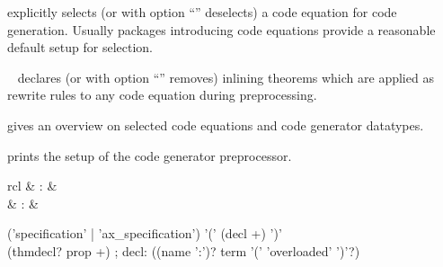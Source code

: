 \begin{isabellebody}
\begin{isamarkuptext}
\begin{description}
  \item \hyperlink{attribute.HOL.code}{\mbox{}} explicitly selects (or with option
  ``'' deselects) a code equation for code
  generation.  Usually packages introducing code equations provide
  a reasonable default setup for selection.

  \item \hyperlink{attribute.HOL.code}{\mbox{}}~ declares (or with
  option ``'' removes) inlining theorems which are
  applied as rewrite rules to any code equation during
  preprocessing.

  \item \hyperlink{command.HOL.print-codesetup}{\mbox{}} gives an overview on
  selected code equations and code generator datatypes.

  \item \hyperlink{command.HOL.print-codeproc}{\mbox{}} prints the setup
  of the code generator preprocessor.

  \end{description}%
\end{isamarkuptext}%
\isamarkuptrue%
%
\isamarkuptrue%
%
\begin{isamarkuptext}%
\begin{matharray}{rcl}
    \hypertarget{command.HOL.specification}{\hyperlink{command.HOL.specification}{\mbox{}}} & : &  \\
    \hypertarget{command.HOL.ax-specification}{\hyperlink{command.HOL.ax-specification}{\mbox{}}} & : &  \\
  \end{matharray}

  \begin{rail}
  ('specification' | 'ax\_specification') '(' (decl +) ')' \\ (thmdecl? prop +)
  ;
  decl: ((name ':')? term '(' 'overloaded' ')'?)
  \end{rail}


\end{isamarkuptext}
\end{isabellebody}
